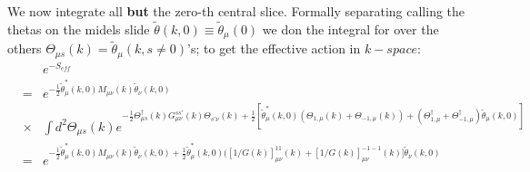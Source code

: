 \documentclass[12 pt]{article}
\newcommand{\nn}{\nonumber \\}
\newcommand\bea{\begin{eqnarray}}
\newcommand\eea{\end{eqnarray}}
\newcommand{\<}{\langle}
\renewcommand{\>}{\rangle}
\begin{document}
We now integrate all {\bf but} the zero-th central slice. Formally separating
calling the thetas on the midels slide $\widetilde \theta(k,0) \equiv
\widetilde \theta_\mu(0) $ we don the 
 integral for over the others  $\Theta_{\mu s}(k) = \widetilde \theta_\mu(k,s \ne 0)$'s; to get the effective action in
$k-space$:
%
\bea
&& e^{\textstyle - S_{eff}} \nn
 &=& e^{\textstyle -\frac{1}{2} \widetilde \theta^*_\mu(k,0)
M_{\mu\nu}(k) \widetilde \theta_\nu(k,0) }  \nn &\times &\int 
d^2\Theta_{\mu s}(k) 
e^{  \textstyle -\frac{1}{2}  \Theta^\dag_{\mu s}(k) G^{ss'}_{\mu\nu} (k) 
  \Theta_{s'\nu}(k)  + \frac{1}{2}[\widetilde \theta^*_\mu(k,0) (
  \Theta_{1,\mu}(k) + \Theta_{-1,\mu}(k))  +(\Theta^\dag_{1,\mu} + \Theta^\dag_{-1,\mu} )\widetilde \theta_\mu(k,0)]}\nn
&=& e^{\textstyle -\frac{1}{2} \widetilde \theta^*_\mu(k,0)
M_{\mu\nu}(k) \widetilde \theta_\nu(k,0)  +  \frac{1}{2} \widetilde
\theta^*_\mu(k,0) ([1/G(k)]^{11}_{\mu\nu} (k)  +[1/G(k)]^{-1-1}_{\mu\nu} (k)]\widetilde \theta_\nu(k,0) } 
\eea
%
\end{document}
